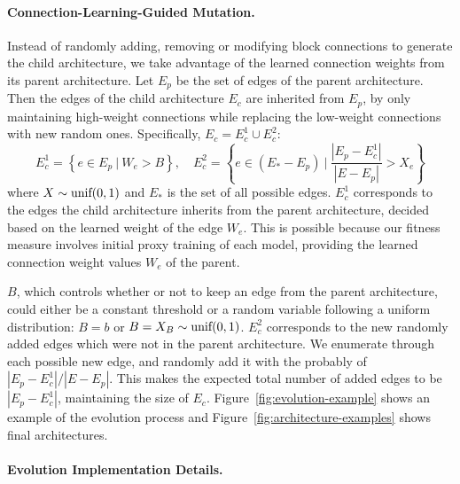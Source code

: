 \documentclass{article} \usepackage{iclr2020_conference,times}
\begin{document}
\vspace{-5pt}
\paragraph{Connection-Learning-Guided Mutation.} Instead of randomly adding, removing or modifying block connections to generate the child architecture, we take advantage of the learned connection weights from its parent architecture. Let $E_p$ be the set of edges of the parent architecture. Then the edges of the child architecture $E_c$ are inherited from $E_p$, by only maintaining high-weight connections while replacing the low-weight connections with new random ones. Specifically, $E_c = E_c^1 \cup E_c^2$:
\begin{equation}
E_c^1 = \left\{e \in E_p ~|~ W_e > B \right\}, \quad E_c^2 = \left\{e \in (E_* - E_p) ~|~ \frac{|E_p - E_c^1|}{|E - E_p|} > X_e \right\}
\end{equation}
where $X\sim \textnormal{unif}(0,1)$ and $E_*$ is the set of all possible edges.
$E_c^1$ corresponds to the edges the child architecture inherits from the parent architecture, decided based on the learned weight of the edge $W_e$. This is possible because our fitness measure involves initial proxy training of each model, providing the learned connection weight values $W_e$ of the parent.



$B$, which controls whether or not to keep an edge from the parent architecture, could either be a constant threshold or a random variable following a uniform distribution: $B = b$ or $B = X_B\sim \textnormal{unif}(0,1)$. $E_c^2$ corresponds to the new randomly added edges which were not in the parent architecture. We enumerate through each possible new edge, and randomly add it with the probably of $|E_p - E_c^1| / |E - E_p|$. This makes the expected total number of added edges to be $|E_p - E_c^1|$, maintaining the size of $E_c$.
Figure~\ref{fig:evolution-example} shows an example of the evolution process and Figure~\ref{fig:architecture-examples} shows final architectures.
















\vspace{-7pt}
\paragraph{Evolution Implementation Details.}
\end{document}
